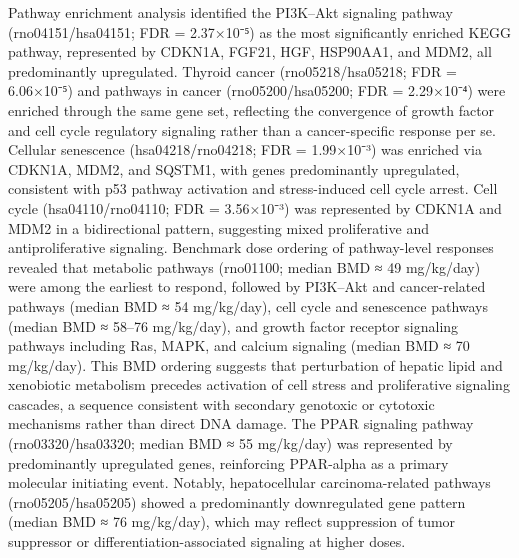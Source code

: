 Pathway enrichment analysis identified the PI3K–Akt signaling pathway (rno04151/hsa04151; FDR = 2.37×10⁻⁵) as the most significantly enriched KEGG pathway, represented by CDKN1A, FGF21, HGF, HSP90AA1, and MDM2, all predominantly upregulated. Thyroid cancer (rno05218/hsa05218; FDR = 6.06×10⁻⁵) and pathways in cancer (rno05200/hsa05200; FDR = 2.29×10⁻⁴) were enriched through the same gene set, reflecting the convergence of growth factor and cell cycle regulatory signaling rather than a cancer-specific response per se. Cellular senescence (hsa04218/rno04218; FDR = 1.99×10⁻³) was enriched via CDKN1A, MDM2, and SQSTM1, with genes predominantly upregulated, consistent with p53 pathway activation and stress-induced cell cycle arrest. Cell cycle (hsa04110/rno04110; FDR = 3.56×10⁻³) was represented by CDKN1A and MDM2 in a bidirectional pattern, suggesting mixed proliferative and antiproliferative signaling. Benchmark dose ordering of pathway-level responses revealed that metabolic pathways (rno01100; median BMD ≈ 49 mg/kg/day) were among the earliest to respond, followed by PI3K–Akt and cancer-related pathways (median BMD ≈ 54 mg/kg/day), cell cycle and senescence pathways (median BMD ≈ 58–76 mg/kg/day), and growth factor receptor signaling pathways including Ras, MAPK, and calcium signaling (median BMD ≈ 70 mg/kg/day). This BMD ordering suggests that perturbation of hepatic lipid and xenobiotic metabolism precedes activation of cell stress and proliferative signaling cascades, a sequence consistent with secondary genotoxic or cytotoxic mechanisms rather than direct DNA damage. The PPAR signaling pathway (rno03320/hsa03320; median BMD ≈ 55 mg/kg/day) was represented by predominantly upregulated genes, reinforcing PPAR-alpha as a primary molecular initiating event. Notably, hepatocellular carcinoma-related pathways (rno05205/hsa05205) showed a predominantly downregulated gene pattern (median BMD ≈ 76 mg/kg/day), which may reflect suppression of tumor suppressor or differentiation-associated signaling at higher doses.


